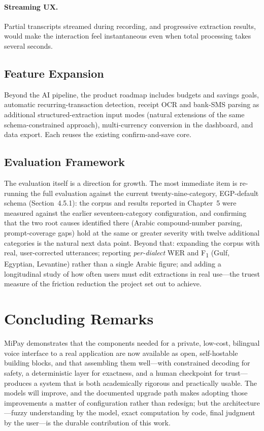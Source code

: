 \paragraph{Streaming UX.} Partial transcripts streamed during recording, and
progressive extraction results, would make the interaction feel instantaneous even
when total processing takes several seconds.

\subsection{Feature Expansion}

Beyond the AI pipeline, the product roadmap includes budgets and savings goals,
automatic recurring-transaction detection, receipt OCR and bank-SMS parsing as
additional structured-extraction input modes (natural extensions of the same
schema-constrained approach), multi-currency conversion in the dashboard, and data
export. Each reuses the existing confirm-and-save core.

\subsection{Evaluation Framework}

The evaluation itself is a direction for growth. The most immediate item is
re-running the full evaluation against the current twenty-nine-category,
EGP-default schema (Section~4.5.1): the corpus and results reported in
Chapter~5 were measured against the earlier seventeen-category configuration,
and confirming that the two root causes identified there (Arabic
compound-number parsing, prompt-coverage gaps) hold at the same or greater
severity with twelve additional categories is the natural next data point.
Beyond that: expanding the corpus with real, user-corrected utterances;
reporting \emph{per-dialect} WER and F\textsubscript{1} (Gulf, Egyptian,
Levantine) rather than a single Arabic figure; and adding a longitudinal study
of how often users must edit extractions in real use---the truest measure of
the friction reduction the project set out to achieve.

\section{Concluding Remarks}

MiPay demonstrates that the components needed for a private, low-cost, bilingual
voice interface to a real application are now available as open, self-hostable
building blocks, and that assembling them well---with constrained decoding for
safety, a deterministic layer for exactness, and a human checkpoint for
trust---produces a system that is both academically rigorous and practically
usable. The models will improve, and the documented upgrade path makes adopting
those improvements a matter of configuration rather than redesign; but the
architecture---fuzzy understanding by the model, exact computation by code,
final judgment by the user---is the durable contribution of this work.

